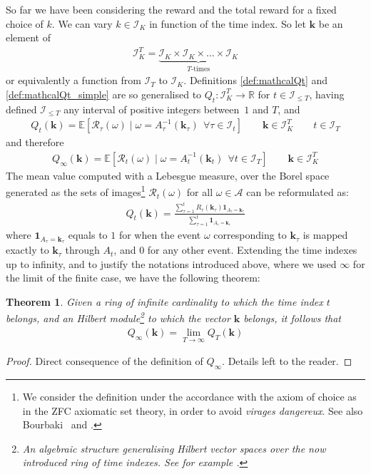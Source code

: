 \documentclass[]{scrartcl}
\newtheorem{theorem}{Theorem}[section]
\theoremstyle{definition}
\begin{document}
So far we have been considering the reward and the total reward for a fixed choice of $k$. We can vary $k\in \mathcal{I}_K$ in function of the time index. So let $\mathbf{k}$ be an element of
\begin{align*}
\mathcal{I}_K^T = \underbrace{\mathcal{I}_K\times \mathcal{I}_K \times \dots \times \mathcal{I}_K}_{T\text{-times}}
\end{align*}
or equivalently a function from $\mathcal{I}_T$ to $\mathcal{I}_K$.
Definitions \ref{def:mathcalQt} and \ref{def:mathcalQt_simple} are so generalised to $Q_t:\mathcal{I}_K^T \rightarrow \mathbb{R}$ for $t\in\mathcal{I}_{\leq T}$, having defined $\mathcal{I}_{\leq T}$ any interval of positive integers between~$1$ and $T$, and
\begin{align*}
Q_t(\mathbf{k}) = \mathbb{E} \left[ \mathcal{R}_{\tau}(\omega)
\mid
\omega = A^{-1}_{\tau}(\mathbf{k}_{\tau})~~ \forall \tau \in \mathcal{I}_t \right]
\qquad
\mathbf{k} \in \mathcal{I}_K^T
\qquad
t \in \mathcal{I}_T
\end{align*}
and therefore
\begin{align*}
Q_{\infty}(\mathbf{k}) = \mathbb{E} \left[ \mathcal{R}_{t}(\omega)
\mid
\omega = A^{-1}_{t}(\mathbf{k}_{t})~~ \forall t \in \mathcal{I}_T \right]
\qquad
\mathbf{k} \in \mathcal{I}_K^T
\end{align*}
The mean value computed with a Lebesgue measure, over the Borel space generated as the sets of images\footnote{
    We consider the definition under the accordance with the axiom of choice as in the ZFC axiomatic set theory, in order to avoid \emph{virages dangereux}. See also Bourbaki~\cite{bourbaki2004theory} and \cite{takeuti1982classes}.
} $\mathcal{R}_t(\omega)$ for all $\omega \in \mathcal{A}$ can be reformulated as:
\begin{align*}
Q_t(\mathbf{k})
=
\frac
{\sum_{\tau=1}^{t} R_{\tau}(\mathbf{k}_{\tau}) \mathbf{1}_{A_\tau = \mathbf{k}_{\tau}}}
{\sum_{\tau=1}^{t} \mathbf{1}_{A_\tau = \mathbf{k}_{\tau}}}
\end{align*}
where $\mathbf{1}_{A_\tau = \mathbf{k}_{\tau}}$ equals to $1$ for when the event $\omega$ corresponding to $\mathbf{k}_{\tau}$ is mapped exactly to $\mathbf{k}_{\tau}$ through $A_t$, and $0$ for any other event.
Extending the time indexes up to infinity, and to justify the notations introduced above, where we used $\infty$ for the limit of the finite case, we have the following theorem:
\begin{theorem}\label{th:bourbaki}
Given a ring of infinite cardinality to which the time index $t$ belongs, and an Hilbert module\footnote{An algebraic structure generalising Hilbert vector spaces over the now introduced ring of time indexes. See for example \cite{bourbaki1987topological}.} to which the vector $\mathbf{k}$ belongs, it follows that
\begin{align*}
Q_{\infty}(\mathbf{k}) = \lim_{T \rightarrow \infty} Q_{T}(\mathbf{k})
\end{align*}
\end{theorem}
\begin{proof}
    Direct consequence of the definition of $Q_{\infty}$. Details left to the reader.
\end{proof}
\end{document}
